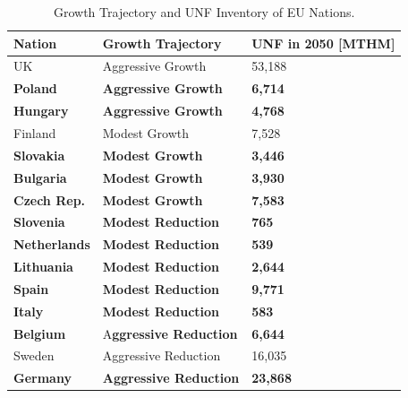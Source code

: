 \begin{frame}
\begin{table}[h]
\begin{adjustbox}{max totalsize={1.1\textwidth}{.8\textheight}, center}
\begin{tabularx}{\textwidth}{lbb}
                    \textbf{Nation} & \textbf{Growth Trajectory} & \small{\textbf{UNF in 2050 [MTHM] }}\\
                    \hline
                    UK & Aggressive Growth & 53,188\\
                    \hline
                    \textbf{Poland} & \textbf{Aggressive Growth} &  \textbf{6,714}\\
                    \hline
                    \textbf{Hungary} & \textbf{Aggressive Growth} & \textbf{4,768} \\ 
                    \hline
                    Finland & Modest Growth &  7,528\\
                    \hline
                    \textbf{Slovakia} & \textbf{Modest Growth} & \textbf{3,446}\\
                    \hline
                   \textbf{Bulgaria} & \textbf{Modest Growth} & \textbf{3,930} \\
                    \hline
                    \textbf{Czech Rep.} & \textbf{Modest Growth} & \textbf{7,583}\\
                    \hline
                    \textbf{Slovenia} & \textbf{Modest Reduction} & \textbf{765}\\
                    \hline
                    \textbf{Netherlands} & \textbf{Modest Reduction} & \textbf{539}\\
                    \hline
                    \textbf{Lithuania} & \textbf{Modest Reduction} & \textbf{2,644}\\
                    \hline 
                    \textbf{Spain} & \textbf{Modest Reduction} &  \textbf{9,771} \\
                    \hline
                    \textbf{Italy} & \textbf{Modest Reduction} & \textbf{583}\\
                    \hline
                    \textbf{Belgium} & A\textbf{ggressive Reduction} & \textbf{6,644}\\
                    \hline
                    Sweden & Aggressive Reduction & 16,035\\
                    \hline
                    \textbf{Germany} & \textbf{Aggressive Reduction} & \textbf{23,868}\\
                    \hline
                    
                \end{tabularx}
    \end{adjustbox}
    \caption {Growth Trajectory and UNF Inventory of \gls{EU} Nations.}
    \label{tab:which_count}
\end{table}
\end{frame}


